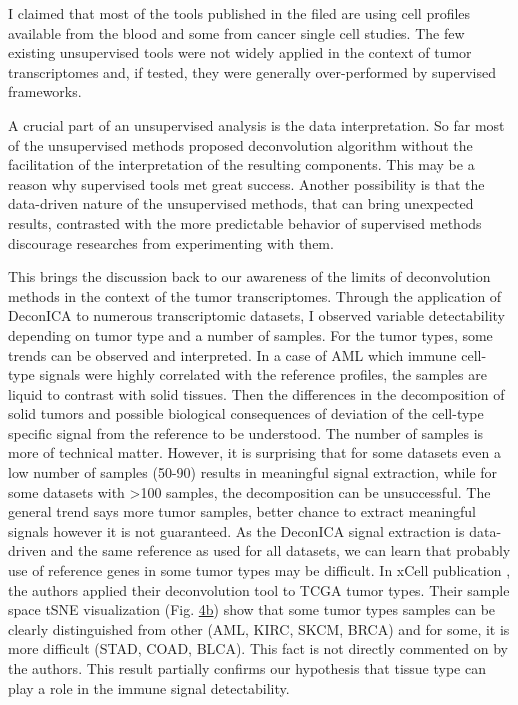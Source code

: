 \documentclass[12pt,]{book}
\theoremstyle{definition}
\theoremstyle{definition}
\theoremstyle{definition}
\theoremstyle{remark}
\begin{document}
I claimed that most of the tools published in the filed are using cell
profiles available from the blood and some from cancer single cell
studies. The few existing unsupervised tools were not widely applied in
the context of tumor transcriptomes and, if tested, they were generally
over-performed by supervised frameworks.

A crucial part of an unsupervised analysis is the data interpretation.
So far most of the unsupervised methods proposed deconvolution algorithm
without the facilitation of the interpretation of the resulting
components. This may be a reason why supervised tools met great success.
Another possibility is that the data-driven nature of the unsupervised
methods, that can bring unexpected results, contrasted with the more
predictable behavior of supervised methods discourage researches from
experimenting with them.

This brings the discussion back to our awareness of the limits of
deconvolution methods in the context of the tumor transcriptomes.
Through the application of DeconICA to numerous transcriptomic datasets,
I observed variable detectability depending on tumor type and a number
of samples. For the tumor types, some trends can be observed and
interpreted. In a case of AML which immune cell-type signals were highly
correlated with the reference profiles, the samples are liquid to
contrast with solid tissues. Then the differences in the decomposition
of solid tumors and possible biological consequences of deviation of the
cell-type specific signal from the reference to be understood. The
number of samples is more of technical matter. However, it is surprising
that for some datasets even a low number of samples (50-90) results in
meaningful signal extraction, while for some datasets with
\textgreater{}100 samples, the decomposition can be unsuccessful. The
general trend says more tumor samples, better chance to extract
meaningful signals however it is not guaranteed. As the DeconICA signal
extraction is data-driven and the same reference as used for all
datasets, we can learn that probably use of reference genes in some
tumor types may be difficult. In xCell publication \citep{Aran2017}, the
authors applied their deconvolution tool to TCGA tumor types. Their
sample space tSNE visualization (Fig.
\href{https://media.springernature.com/full/springer-static/image/art\%3A10.1186\%2Fs13059-017-1349-1/MediaObjects/13059_2017_1349_Fig4_HTML.gif}{4b})
show that some tumor types samples can be clearly distinguished from
other (AML, KIRC, SKCM, BRCA) and for some, it is more difficult (STAD,
COAD, BLCA). This fact is not directly commented on by the authors. This
result partially confirms our hypothesis that tissue type can play a
role in the immune signal detectability.
\end{document}

